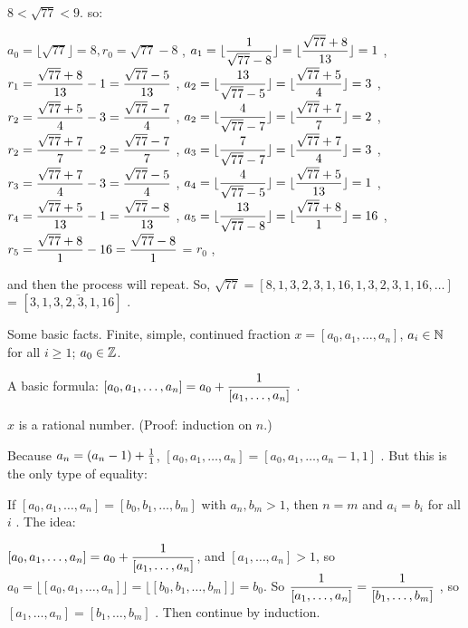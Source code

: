 \msk

$8 < \sqrt{77} < 9$. so: 

$a_0=\lfloor\sqrt{77}\rfloor = 8, r_0=\sqrt{77}-8$ , 
\hhsk
$\displaystyle a_1 = \lfloor{{1}\over{\sqrt{77}-8}}\rfloor = \lfloor {{\sqrt{77}+8}\over{13}}\rfloor = 1$ , 
$\displaystyle r_1 = {{\sqrt{77}+8}\over{13}} -1 = {{\sqrt{77}-5}\over{13}}$ , 
\hhsk
$\displaystyle a_2 = \lfloor{{13}\over{\sqrt{77}-5}}\rfloor = \lfloor {{\sqrt{77}+5}\over{4}}\rfloor = 3$ , 
$\displaystyle r_2 = {{\sqrt{77}+5}\over{4}} -3 = {{\sqrt{77}-7}\over{4}}$ , 
\hhsk
$\displaystyle a_2 = \lfloor{{4}\over{\sqrt{77}-7}}\rfloor = \lfloor {{\sqrt{77}+7}\over{7}}\rfloor = 2$ , 
$\displaystyle r_2 = {{\sqrt{77}+7}\over{7}} -2 = {{\sqrt{77}-7}\over{7}}$ , 
\hhsk
$\displaystyle a_3 = \lfloor{{7}\over{\sqrt{77}-7}}\rfloor = \lfloor {{\sqrt{77}+7}\over{4}}\rfloor = 3$ , 
$\displaystyle r_3 = {{\sqrt{77}+7}\over{4}} -3 = {{\sqrt{77}-5}\over{4}}$ , 
\hhsk
$\displaystyle a_4 = \lfloor{{4}\over{\sqrt{77}-5}}\rfloor = \lfloor {{\sqrt{77}+5}\over{13}}\rfloor = 1$ , 
$\displaystyle r_4 = {{\sqrt{77}+5}\over{13}} -1 = {{\sqrt{77}-8}\over{13}}$ , 
\hhsk
$\displaystyle a_5 = \lfloor{{13}\over{\sqrt{77}-8}}\rfloor = \lfloor {{\sqrt{77}+8}\over{1}}\rfloor = 16$ , 
$\displaystyle r_5 = {{\sqrt{77}+8}\over{1}} -16 = {{\sqrt{77}-8}\over{1}}$  = $r_0$ , 

and then the process will repeat.
\hhsk
So, $\sqrt{77} = [8,1,3,2,3,1,16,1,3,2,3,1,16,\ldots]$ = $[3,\overline{1,3,2,3,1,16}]$ .

\msk

Some basic facts. Finite, simple, continued fraction $x=[a_0,a_1,\ldots ,a_n]$, $a_i\in {\Bbb N}$ for all $i\geq 1$; 
$a_0\in{\Bbb Z}$.

\ssk

A basic formula: $\displaystyle [a_0,a_1,\ldots ,a_n] = a_0+{{1}\over{[a_1,\ldots ,a_n]}}$ .

\msk

$x$ is a rational number. (Proof: induction on $n$.)

\ssk

Because $a_n=(a_n-1)+{{1}\over{1}}$, $[a_0,a_1,\ldots ,a_n] = [a_0,a_1,\ldots ,a_n-1,1]$ . But this is the only type of equality:

If $[a_0,a_1,\ldots ,a_n] = [b_0,b_1,\ldots ,b_m]$ with $a_n,b_m>1$, then $n=m$ and $a_i=b_i$ for all $i$ . \hhsk The idea: 

$\displaystyle [a_0,a_1,\ldots ,a_n] = a_0+{{1}\over{[a_1,\ldots ,a_n]}}$, and $[a_1,\ldots ,a_n]>1$, so 
$a_0=\lfloor [a_0,a_1,\ldots ,a_n]\rfloor = \lfloor [b_0,b_1,\ldots ,b_m]\rfloor = b_0$. 
So $\displaystyle {{1}\over{[a_1,\ldots ,a_n]}} = {{1}\over{[b_1,\ldots ,b_m]}}$ , so $[a_1,\ldots ,a_n] = [b_1,\ldots ,b_m]$ .
Then continue by induction.

